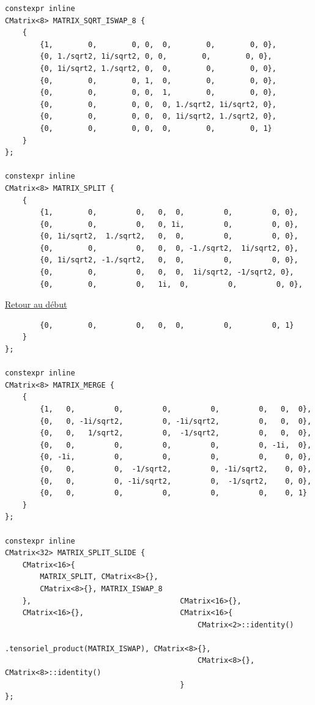 {\begin{frame}[fragile]
\begin{verbatim}
constexpr inline
CMatrix<8> MATRIX_SQRT_ISWAP_8 {
    {
        {1,        0,        0, 0,  0,        0,        0, 0},
        {0, 1./sqrt2, 1i/sqrt2, 0, 0,        0,        0, 0},
        {0, 1i/sqrt2, 1./sqrt2, 0,  0,        0,        0, 0},
        {0,        0,        0, 1,  0,        0,        0, 0},
        {0,        0,        0, 0,  1,        0,        0, 0},
        {0,        0,        0, 0,  0, 1./sqrt2, 1i/sqrt2, 0},
        {0,        0,        0, 0,  0, 1i/sqrt2, 1./sqrt2, 0},
        {0,        0,        0, 0,  0,        0,        0, 1}
    }
};

constexpr inline
CMatrix<8> MATRIX_SPLIT {
    {
        {1,        0,         0,   0,  0,         0,         0, 0},
        {0,        0,         0,   0, 1i,         0,         0, 0},
        {0, 1i/sqrt2,  1./sqrt2,   0,  0,         0,         0, 0},
        {0,        0,         0,   0,  0, -1./sqrt2,  1i/sqrt2, 0},
        {0, 1i/sqrt2, -1./sqrt2,   0,  0,         0,         0, 0},
        {0,        0,         0,   0,  0,  1i/sqrt2, -1/sqrt2, 0},
        {0,        0,         0,   1i,  0,         0,         0, 0},
\end{verbatim}
\end{frame}

\begin{frame}[fragile]
\hyperlink{conclusion}{Retour au début}\newline
\begin{verbatim}
        {0,        0,         0,   0,  0,         0,         0, 1}
    }
};

constexpr inline
CMatrix<8> MATRIX_MERGE {
    {
        {1,   0,         0,         0,         0,         0,   0,  0},
        {0,   0, -1i/sqrt2,         0, -1i/sqrt2,         0,   0,  0},
        {0,   0,   1/sqrt2,         0,  -1/sqrt2,         0,   0,  0},
        {0,   0,         0,         0,         0,         0, -1i,  0},
        {0, -1i,         0,         0,         0,         0,    0, 0},
        {0,   0,         0,  -1/sqrt2,         0, -1i/sqrt2,    0, 0},
        {0,   0,         0, -1i/sqrt2,         0,  -1/sqrt2,    0, 0},
        {0,   0,         0,         0,         0,         0,    0, 1}
    }
};

constexpr inline
CMatrix<32> MATRIX_SPLIT_SLIDE {
    CMatrix<16>{
        MATRIX_SPLIT, CMatrix<8>{},
        CMatrix<8>{}, MATRIX_ISWAP_8
    },                                  CMatrix<16>{},
    CMatrix<16>{},                      CMatrix<16>{
                                            CMatrix<2>::identity()
                                                .tensoriel_product(MATRIX_ISWAP), CMatrix<8>{},
                                            CMatrix<8>{}, CMatrix<8>::identity()
                                        }
};
\end{verbatim}
\end{frame}

}
